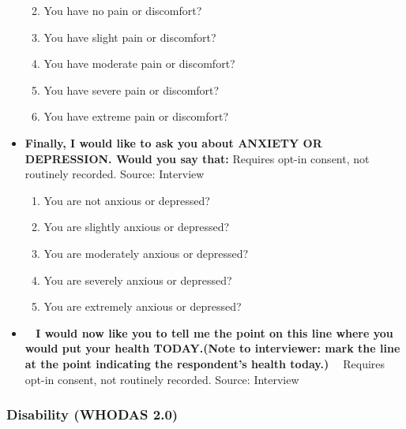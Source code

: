 \documentclass[
]{scrartcl}
\providecommand{\tightlist}{%
  \setlength{\itemsep}{0pt}\setlength{\parskip}{0pt}}\usepackage{longtable,booktabs,array}
\begin{document}
\begin{itemize}
  \begin{enumerate}
  \def\labelenumi{\arabic{enumi}.}
  \tightlist
  \item
    You have no pain or discomfort?
  \item
    You have slight pain or discomfort?
  \item
    You have moderate pain or discomfort?
  \item
    You have severe pain or discomfort?
  \item
    You have extreme pain or discomfort?
  \end{enumerate}
\item
  \textbf{Finally, I would like to ask you about ANXIETY OR DEPRESSION.
  Would you say that:} Requires opt-in consent, not routinely recorded.
  Source: Interview

  \begin{enumerate}
  \def\labelenumi{\arabic{enumi}.}
  \tightlist
  \item
    You are not anxious or depressed?
  \item
    You are slightly anxious or depressed?
  \item
    You are moderately anxious or depressed?
  \item
    You are severely anxious or depressed?
  \item
    You are extremely anxious or depressed?
  \end{enumerate}
\item
  \textbf{~ I would now like you to tell me the point on this line where
  you would put your health TODAY.(Note to interviewer: mark the line at
  the point indicating the respondent's health today.) ~} Requires
  opt-in consent, not routinely recorded. Source: Interview
\end{itemize}

\hypertarget{disability-whodas-2.0}{%
\subsubsection{Disability (WHODAS 2.0)}\label{disability-whodas-2.0}}
\end{document}
